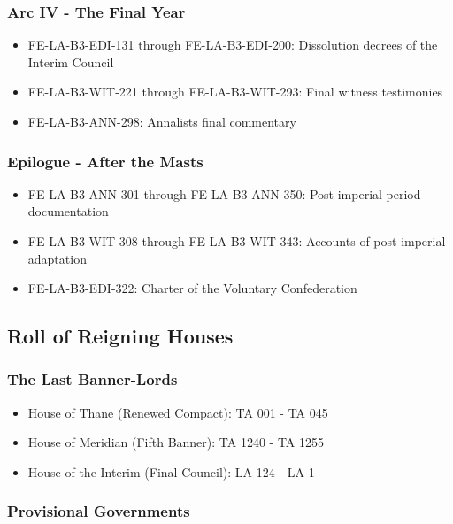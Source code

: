 \subsubsection{Arc IV - The Final Year}\label{arc-iv---the-final-year}

\begin{itemize}
\tightlist
\item
  FE-LA-B3-EDI-131 through FE-LA-B3-EDI-200: Dissolution decrees of the
  Interim Council
\item
  FE-LA-B3-WIT-221 through FE-LA-B3-WIT-293: Final witness testimonies
\item
  FE-LA-B3-ANN-298: Annalist\textquotesingle s final commentary
\end{itemize}

\subsubsection{Epilogue - After the
Masts}\label{epilogue---after-the-masts}

\begin{itemize}
\tightlist
\item
  FE-LA-B3-ANN-301 through FE-LA-B3-ANN-350: Post-imperial period
  documentation
\item
  FE-LA-B3-WIT-308 through FE-LA-B3-WIT-343: Accounts of post-imperial
  adaptation
\item
  FE-LA-B3-EDI-322: Charter of the Voluntary Confederation
\end{itemize}

\subsection{Roll of Reigning Houses}\label{roll-of-reigning-houses}

\subsubsection{The Last Banner-Lords}\label{the-last-banner-lords}

\begin{itemize}
\tightlist
\item
  House of Thane (Renewed Compact): TA 001 - TA 045
\item
  House of Meridian (Fifth Banner): TA 1240 - TA 1255
\item
  House of the Interim (Final Council): LA 124 - LA 1
\end{itemize}

\subsubsection{Provisional Governments}\label{provisional-governments}

